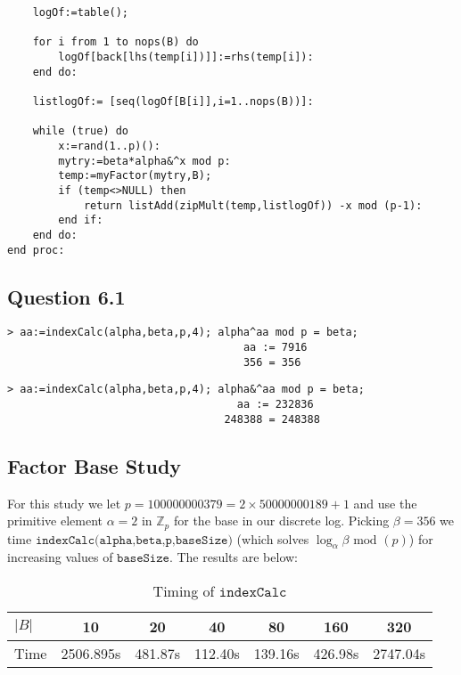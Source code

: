 \documentclass[article,oneside]{memoir}
\begin{document}
\begin{verbatim}
    logOf:=table();

    for i from 1 to nops(B) do 
        logOf[back[lhs(temp[i])]]:=rhs(temp[i]):	
    end do:
    
    listlogOf:= [seq(logOf[B[i]],i=1..nops(B))]:
    
    while (true) do
        x:=rand(1..p)():
        mytry:=beta*alpha&^x mod p:
        temp:=myFactor(mytry,B);
        if (temp<>NULL) then
            return listAdd(zipMult(temp,listlogOf)) -x mod (p-1):
        end if:
    end do:
end proc:

\end{verbatim}

\subsection*{Question 6.1}

\begin{verbatim}
> aa:=indexCalc(alpha,beta,p,4); alpha^aa mod p = beta;
                                     aa := 7916
                                     356 = 356
\end{verbatim}

\begin{verbatim}
> aa:=indexCalc(alpha,beta,p,4); alpha&^aa mod p = beta;
                                    aa := 232836
                                  248388 = 248388
\end{verbatim}

\subsection*{Factor Base Study}

For this study we let $p=100000000379=2\times50000000189+1$ and use the primitive element $\alpha=2$ in $\mathbb{Z}_p$ for the base in our discrete log. Picking $\beta = 356$ we time $\texttt{indexCalc(alpha,beta,p,baseSize)}$ (which solves $\log_\alpha \beta \textrm{ mod } (p)$) for increasing values of $\texttt{baseSize}$. The results are below:



\begin{table}[htbp]
  \centering
  \begin{tabular}{lcccccc} %
    \toprule\textit{}
   $|B|$ & 10 & 20 & 40 & 80  & 160 & 320\\
    \midrule
	Time & 2506.895s & 481.87s & 112.40s & 139.16s & 426.98s & 2747.04s\\
    \bottomrule
  \end{tabular}
  \caption{Timing of $\texttt{indexCalc}$}
  \label{tab:basic-align}
\end{table}
\end{document}

